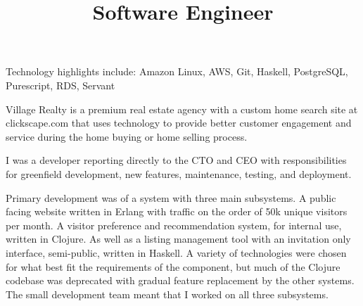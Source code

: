 \documentclass[margintitle,line]{res}
\begin{document}
\begin{resume}
\begin{position}
  Technology highlights include: Amazon Linux, AWS, Git, Haskell, PostgreSQL,
  Purescript, RDS, Servant
\end{position}

\title{Software Engineer}
\begin{position}
  Village Realty is a premium real estate agency with a custom home search site
  at clickscape.com that uses technology to provide better customer engagement
  and service during the home buying or home selling process.

  I was a developer reporting directly to the CTO and CEO with responsibilities
  for greenfield development, new features, maintenance, testing, and deployment.

  Primary development was of a system with three main subsystems.
  A public facing website written in Erlang with traffic on the order of 50k
  unique visitors per month. A visitor preference and recommendation system,
  for internal use, written in Clojure. As well as a listing management tool with
  an invitation only interface, semi-public, written in Haskell. A variety of
  technologies were chosen for what best fit the requirements of the component,
  but much of the Clojure codebase was deprecated with gradual feature
  replacement by the other systems. The small development team meant that I
  worked on all three subsystems.




\end{position}
\end{resume}
\end{document}
